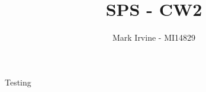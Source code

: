 \documentclass[pdftex]{article}	%
\title{SPS - CW2}
\author{Mark Irvine - MI14829}
\begin{document}
	\maketitle
	\makepage

	Testing
\end{document}
